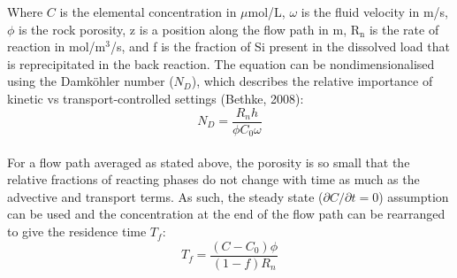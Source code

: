 Where \( C \) is the elemental concentration in $\mu$mol/L, $\omega$ is the fluid velocity in m/s, $\phi$ is the rock porosity, z is a position along the flow path in m, R$_\text{n}$ is the rate of reaction in mol/m$^3$/s, and f is the fraction of Si present in the dissolved load that is reprecipitated in the back reaction. The equation can be nondimensionalised using the Damköhler number (\(N_D\)), which describes the relative importance of kinetic vs transport-controlled settings (Bethke, 2008):\\

\begin{equation}
    N_D = \frac{R_n h}{\phi C_0 \omega}
\end{equation}\\

For a flow path averaged as stated above, the porosity is so small that the relative fractions of reacting phases do not change with time as much as the advective and transport terms. As such, the steady state (\(\partial C/\partial t = 0\)) assumption can be used and the concentration at the end of the flow path can be rearranged to give the residence time \(T_f\):\\

\begin{equation}
    T_f = \frac{(C - C_0)\phi}{(1-f)R_n}
\end{equation}


